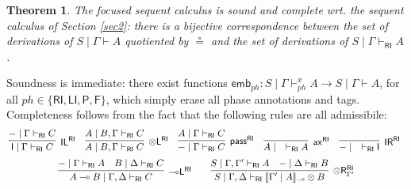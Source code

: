 \documentclass[submission,copyright,creativecommons]{eptcs}
\newtheorem{theorem}{Theorem}[section]
\newtheorem{lemma}[theorem]{Lemma}
\theoremstyle{definition}
\newcommand{\ldbc}{[\![}
\newcommand{\rdbc}{]\!]}
\newcommand{\tl}{\otimes \mathsf{L}}
\newcommand{\tr}{\otimes \mathsf{R}}
\newcommand{\lleft}{{\multimap}\mathsf{L}}
\newcommand{\pass}{\mathsf{pass}}
\newcommand{\unitl}{\mathsf{IL}}
\newcommand{\unitr}{\mathsf{IR}}
\newcommand{\ax}{\mathsf{ax}}
\newcommand{\ot}{\otimes}
\newcommand{\lolli}{\multimap}
\newcommand{\I}{\mathsf{I}}
\newcommand{\RI}{\mathsf{RI}}
\newcommand{\LI}{\mathsf{LI}}
\newcommand{\Pass}{\mathsf{P}}
\newcommand{\F}{\mathsf{F}}
\newcommand{\NMILL}{\texttt{NMILL}}
\newcommand{\SkNMILL}{\NMILL\textsuperscript{\textit{s}}}
\begin{document}
 \begin{theorem}
   The focused sequent calculus is sound and complete wrt. the  sequent calculus of Section \ref{sec2}: there is a bijective correspondence between the set of derivations of $S \mid \Gamma \vdash A$ quotiented by $\circeq$ and the set of derivations of $S \mid \Gamma \vdash_\RI A$.
 \end{theorem}
Soundness is immediate: there exist functions $\mathsf{emb}_{ph} : S \mid \Gamma \vdash^x_{ph} A \to S \mid \Gamma \vdash A$, for all $ph \in \{\RI,\LI,\Pass, \F \}$, which simply erase all phase annotations and tags. Completeness follows from the fact that the following rules are all admissibile: %
\begin{equation}\label{eq:admis}
  \begin{array}{c}
    \hspace{-3.9pt}
    \infer[\unitl^{\RI}]{\I \mid \Gamma \vdash_{\RI} C}{- \mid \Gamma \vdash_{\RI} C}
    \quad
    \infer[\tl^{\RI}]{A \mid B, \Gamma \vdash_{\RI} C}{A \mid B, \Gamma \vdash_{\RI} C}
    \quad
    \infer[\pass^{\RI}]{- \mid \Gamma \vdash_{\RI} C}{A \mid \Gamma \vdash_{\RI} C}
    \quad
    \infer[\ax^{\RI}]{A \mid \quad \vdash_{\RI} A}{}
    \quad
    \infer[\unitr^{\RI}]{- \mid \quad \vdash_{\RI} \I}{}
\\[6pt]
    \infer[\lleft^{\RI}]{A \lolli B \mid \Gamma , \Delta \vdash_{\RI} C}{
    - \mid \Gamma \vdash_{\RI} A
    &
    B \mid \Delta \vdash_{\RI} C
    }
    \qquad
    \infer[\tr_{\Gamma'}^{\RI}]{S \mid \Gamma , \Delta \vdash_{\RI} \ldbc \Gamma' \mid A \rdbc_{\lolli} \ot B}{
      S \mid \Gamma , \Gamma' \vdash_{\RI} A
      &
      - \mid \Delta \vdash_{\RI} B
    }
  \end{array}
\end{equation}
\end{document}
